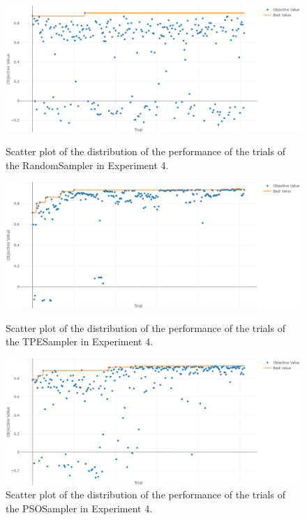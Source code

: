 \begin{figure}[H]
    \begin{minipage}{\textwidth}
        \centering
        \includegraphics[width=13.8cm]{figures/figure-4.4.2.png}
        \caption[Trials Performance Distribution of RandomSampler - Experiment 4]{Scatter plot of the distribution of the performance of the trials of the RandomSampler in Experiment 4.}
        \label{fig:figure-4.4.2}
    \end{minipage}

    \begin{minipage}{\textwidth}
        \centering
        \includegraphics[width=13.8cm]{figures/figure-4.4.3.png}
        \caption[Trials Performance Distribution of TPESampler - Experiment 4]{Scatter plot of the distribution of the performance of the trials of the TPESampler in Experiment 4.}
        \label{fig:figure-4.4.3}
    \end{minipage}

    \begin{minipage}{\textwidth}
        \centering
        \includegraphics[width=13.8cm]{figures/figure-4.4.4.png}
        \caption[Trials Performance Distribution of PSOSampler - Experiment 4]{Scatter plot of the distribution of the performance of the trials of the PSOSampler in Experiment 4.}
        \label{fig:figure-4.4.4}
    \end{minipage}
\end{figure}

